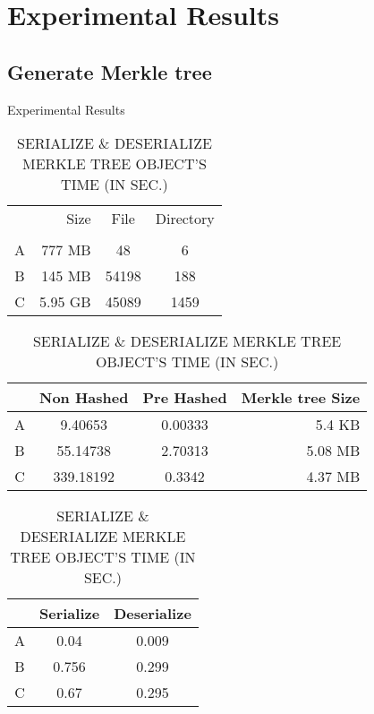 \section{Experimental Results}

\subsection{Generate Merkle tree}
\begin{frame}{Experimental Results}
	\begin{table}[]
		\scriptsize
		\centering
		\begin{tabular}{crcc}
			  & Size    & File  & Directory \\
			  &			&		&		    \\
			A & 777 MB  & 48    & 6         \\
			B & 145 MB  & 54198 & 188       \\
			C & 5.95 GB & 45089 & 1459      \\
		\end{tabular}
        
		\caption{GENERATE MERKLE TREE'S TIME (IN SEC.)}
		\begin{tabular}{|c|c|c|r|}
			\hline
              & Non Hashed & Pre Hashed & Merkle tree Size \\ \hline
            A & 9.40653    & 0.00333    & 5.4 KB           \\ \hline
            B & 55.14738   & 2.70313    & 5.08 MB          \\ \hline
            C & 339.18192  & 0.3342     & 4.37 MB          \\ \hline
		\end{tabular}
        
        \caption{SERIALIZE \& DESERIALIZE MERKLE TREE OBJECT'S TIME (IN SEC.)}
		\begin{tabular}{|c|c|c|}
            \hline
              & Serialize & Deserialize \\ \hline
            A & 0.04      & 0.009       \\ \hline
            B & 0.756     & 0.299       \\ \hline
            C & 0.67      & 0.295       \\ \hline
		\end{tabular}
	\end{table}
\end{frame}

